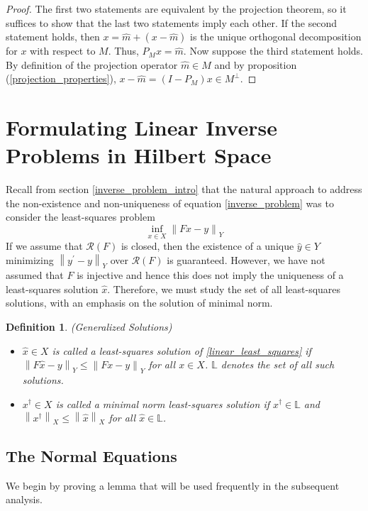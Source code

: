 \documentclass[12pt]{article}
\newcommand*{\norm}[1]{\left\lVert#1\right\rVert}
\newcommand{\R}{\mathcal{R}}
\newtheorem{definition}{Definition}
\begin{document}
\begin{proof} 
The first two statements are equivalent by the projection theorem, so it suffices to show that the last two 
statements imply each other. If the second statement holds, then $x = \hat{m} + (x - \hat{m})$ is the unique 
orthogonal decomposition for $x$ with respect to $M$. Thus, $P_M x = \hat{m}$. Now suppose the third 
statement holds. By definition of the projection operator $\hat{m} \in M$ and by proposition 
(\ref{projection_properties}),  $x - \hat{m} = (I - P_M)x \in M^\perp$. 
\end{proof} 

\section{Formulating Linear Inverse Problems in Hilbert Space} \label{formulation}

 Recall from section \ref{inverse_problem_intro} that the natural approach to address the non-existence 
 and non-uniqueness of equation \eqref{inverse_problem} was to consider the least-squares problem 
 \begin{equation} 
 \inf_{x \in X} \norm{Fx - y}_Y \label{linear_least_squares}
 \end{equation} 
If we assume that $\mathcal{R}(F)$ is closed, 
then the existence of a unique $\hat{y} \in Y$ minimizing $\norm{y^\prime - y}_Y$ 
 over $\R(F)$ is guaranteed. However, we have not assumed that $F$ is injective and hence this does not 
 imply the uniqueness of a least-squares solution $\hat{x}$. Therefore, we must study the set of all 
 least-squares solutions, with an emphasis on the solution of minimal norm. 
 
 \begin{definition} 
(Generalized Solutions) 
 \begin{itemize}
 \item $\hat{x} \in X$ is called a least-squares solution of \eqref{linear_least_squares} if $\norm{F\hat{x} - y}_Y \leq \norm{Fx - y}_Y$ for all $x \in X$. $\mathbb{L}$ denotes the set of all such solutions. 
 \item $x^\dagger \in X$ is called a minimal norm least-squares solution if $x^\dagger \in \mathbb{L}$ and $\norm{x^\dagger}_X \leq \norm{\hat{x}}_X$ for all $\hat{x} \in \mathbb{L}$. 
 \end{itemize} 
\end{definition} 

\subsection{The Normal Equations}
We begin by proving a lemma that will be used frequently in the subsequent analysis. 
\end{document}
